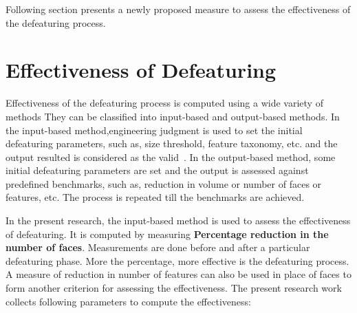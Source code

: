 Following section presents a newly proposed measure to assess the effectiveness of the defeaturing process.

\section{Effectiveness of Defeaturing}\label{sec:defeaturing:effectiveness}


Effectiveness of the defeaturing process is computed using a wide variety of methods They can be classified into input-based and output-based methods. In the input-based method,engineering judgment is used to set the initial defeaturing parameters, such as, size threshold, feature taxonomy, etc. and the output resulted is considered as the valid~\cite{MobleyCarrollCanann1998}. In the output-based method, some initial defeaturing parameters are set and the output is assessed against predefined benchmarks, such as, reduction in volume or number of faces or features, etc. The process is repeated till the benchmarks are  achieved. 

In the present research, the input-based method is used to assess the effectiveness of defeaturing. It is computed by measuring {\bf Percentage reduction in the number of faces}. Measurements are done before and after a particular defeaturing phase. More the percentage, more effective is the defeaturing process. A measure of reduction in number of features can also be used in place of faces to form another criterion for assessing the effectiveness. The present research work collects following parameters to compute the effectiveness:


